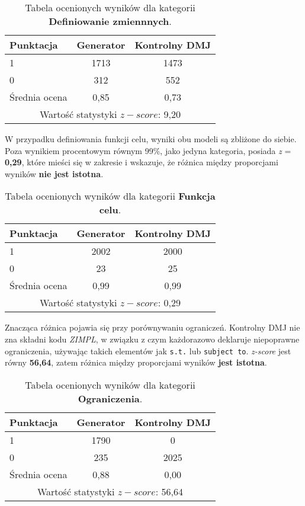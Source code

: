 \begin{table}[H]
\caption{Tabela ocenionych wyników dla kategorii \textbf{Definiowanie zmiennnych}.}\label{tab:tabela19}
\centering%
\begin{tabular}{|l|c|c|}
\hline
\textbf{Punktacja} & \textbf{Generator} & \textbf{Kontrolny DMJ}\\
\hline
1 & 1713 & 1473 \\
\hline
0 & 312 & 552 \\
\hline
Średnia ocena & 0,85 & 0,73 \\
\hline
\multicolumn{3}{|c|}{Wartość statystyki \( z-score \): 9,20} \\
\hline
\end{tabular}
\end{table}


W przypadku definiowania funkcji celu, wyniki obu modeli są zbliżone do siebie. Poza wynikiem procentowym równym 99\%, jako jedyna kategoria, posiada \textit{z} = \textbf{0,29}, które mieści się w zakresie i wskazuje, że różnica między proporcjami wyników \textbf{nie jest istotna}.

\begin{table}[H]
\caption{Tabela ocenionych wyników dla kategorii \textbf{Funkcja celu}.}\label{tab:tabela20}
\centering%
\begin{tabular}{|l|c|c|}
\hline
\textbf{Punktacja} & \textbf{Generator} & \textbf{Kontrolny DMJ}\\
\hline
1 & 2002 & 2000 \\
\hline
0 & 23 & 25 \\
\hline
Średnia ocena & 0,99 & 0,99 \\
\hline
\multicolumn{3}{|c|}{Wartość statystyki \( z-score \): 0,29} \\
\hline
\end{tabular}
\end{table}

Znacząca różnica pojawia się przy porównywaniu ograniczeń. Kontrolny DMJ nie zna składni kodu  \textit{ZIMPL}, w związku z czym każdorazowo deklaruje niepoprawne ograniczenia, używając takich elementów jak \texttt{s.t.} lub \texttt{subject to}. \textit{z-score} jest równy \textbf{56,64}, zatem różnica między proporcjami wyników \textbf{jest istotna}.

\begin{table}[H]
\caption{Tabela ocenionych wyników dla kategorii \textbf{Ograniczenia}.}\label{tab:tabela21}
\centering%
\begin{tabular}{|l|c|c|}
\hline
\textbf{Punktacja} & \textbf{Generator} & \textbf{Kontrolny DMJ}\\
\hline
1 & 1790 & 0 \\
\hline
0 & 235 & 2025 \\
\hline
Średnia ocena & 0,88 & 0,00 \\
\hline
\multicolumn{3}{|c|}{Wartość statystyki \( z-score \): 56,64} \\
\hline
\end{tabular}
\end{table}


